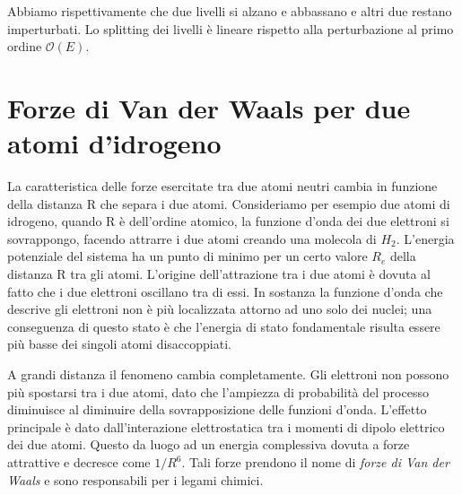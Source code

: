 \begin{center}
\end{center}
Abbiamo rispettivamente che due livelli si alzano e abbassano e altri due restano imperturbati.
Lo splitting dei livelli \`e lineare rispetto alla perturbazione al primo ordine $\mathcal{O}(E)$.

\section{Forze di Van der Waals per due atomi d'idrogeno}

La caratteristica delle forze esercitate tra due atomi neutri cambia in funzione della distanza R che separa i due atomi. Consideriamo per esempio due atomi di idrogeno, quando R \`e dell'ordine atomico, la funzione d'onda dei due elettroni si sovrappongo, facendo attrarre i due atomi creando una molecola di $H_2$. L'energia potenziale del sistema ha un punto di minimo per un certo valore $R_e$ della distanza R tra gli atomi. L'origine dell'attrazione tra i due atomi \`e dovuta al fatto che i due elettroni oscillano tra di essi. In sostanza la funzione d'onda che descrive gli elettroni non \`e pi\`u localizzata attorno ad uno solo dei nuclei; una conseguenza di questo stato \`e che l'energia di stato fondamentale risulta essere pi\`u basse dei singoli atomi disaccoppiati.

A grandi distanza il fenomeno cambia completamente. Gli elettroni non possono pi\`u spostarsi tra i due atomi, dato che l'ampiezza di probabilit\`a del processo diminuisce al diminuire della sovrapposizione delle funzioni d'onda. L'effetto principale \`e dato dall'interazione elettrostatica tra i momenti di dipolo elettrico dei due atomi. Questo da luogo ad un energia complessiva dovuta a forze attrattive e decresce come $1/R^6$.  Tali forze prendono il nome di \textit{forze di Van der Waals} e sono responsabili per i legami chimici.


